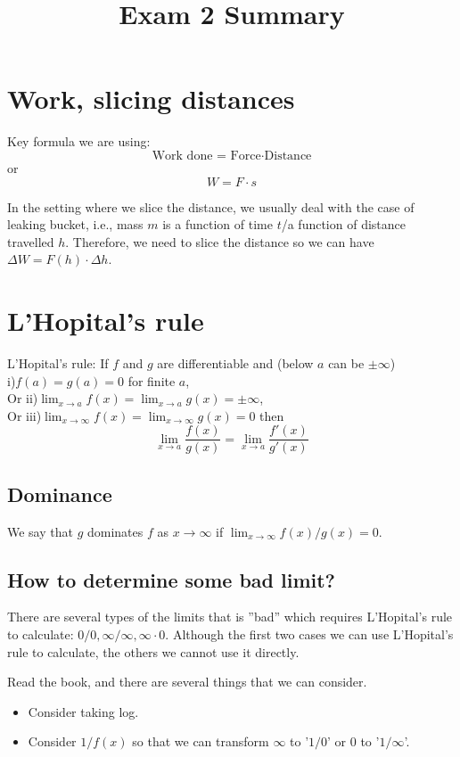 \documentclass[12pt]{article}
\date{}
\title{Exam 2 Summary}
\theoremstyle{definition}
\theoremstyle{definition}
\theoremstyle{remark}
\theoremstyle{definition}
\theoremstyle{definition}
\theoremstyle{definition}
\begin{document}
\maketitle
\section{Work, slicing distances}

Key formula we are using:\\\[
\text{Work done = Force} \cdot \text{Distance}\] or 
\[W=F\cdot s\]

In the setting where we slice the distance, we usually deal with the case of leaking bucket, i.e., mass $m$ is a function of time $t$/a function of distance travelled $h$.
Therefore, we need to slice the distance so we can have $\Delta W=F(h) \cdot \Delta h$.

\section{L'Hopital's rule}

L’Hopital’s rule: If $f$ and $g$ are differentiable and (below $a$ can be $\pm \infty$)\\
i)$f(a) = g(a) = 0$ for finite $a$, \\
Or ii)$\lim_{x\to a} f(x)=\lim_{x\to a} g(x)= \pm \infty$,\\ 
Or iii)$\lim_{x\to \infty} f(x)= \lim_{x\to \infty} g(x) = 0$
then 
\[\lim_{x\to a}\frac{f(x)}{g(x)} = \lim_{x\to a} \frac{f'(x)}{g'(x)} \]

\subsection{Dominance}
We say that $g$ dominates $f$ as $x \to \infty$ if $\lim_{x\to \infty}f(x)/g(x) = 0$. 
\subsection{How to determine some bad limit?}

There are several types of the limits that is ''bad'' which requires L'Hopital's rule to calculate:
$0/0, \infty/\infty, \infty\cdot0$. Although the first two cases we can use L'Hopital's rule to calculate, the others we cannot use it directly.

Read the book, and there are several things that we can consider.
\begin{itemize}
	\item Consider taking log.
	\item Consider $1/f(x)$ so that we can transform $\infty$ to '$1/0$' or $0$ to '$1/\infty$'.
\end{itemize}
\end{document}
